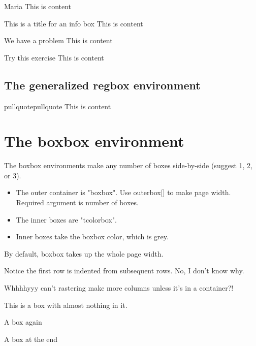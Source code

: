 \documentclass[
  letterpaper, 12pt
]{report}
\begin{document}
\begin{casebox}{Maria}
This is content
\end{casebox}

\begin{fyibox}{This is a title for an info box}
This is content
\end{fyibox}

\begin{warnbox}{We have a problem}
This is content
\end{warnbox}

\begin{exbox}{Try this exercise}
This is content
\end{exbox}

\subsection{The generalized regbox environment}

\begin{regbox}{pullquote}{\faQuoteLeft}{pullquote}
This is content
\end{regbox}

\section{The boxbox environment}

The boxbox environments make any number of boxes side-by-side (suggest 1, 2, or 3). 

\begin{itemize}
\item The outer container is "boxbox".   Use outerbox[] to make page width.  Required argument is number of boxes.
\item The inner boxes are "tcolorbox".
\item Inner boxes take the boxbox color, which is grey.
\end{itemize}

By default, boxbox takes up the whole page width.
\begin{boxbox}{3}
\begin{tcolorbox}[title=first box] Notice the first row is indented from subsequent rows.  No, I don't know why.\end{tcolorbox}
\begin{tcolorbox}Whhhhyyy can't rastering make more columns unless it's in a container?!
\end{tcolorbox}
\begin{tcolorbox}This is a box with almost nothing in it.\end{tcolorbox}
\begin{tcolorbox}A box again\end{tcolorbox}
\begin{tcolorbox}[title=last box]A box at the end\end{tcolorbox}
\end{boxbox}
\end{document}
